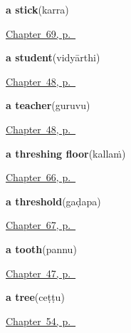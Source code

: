 \noindent\begin{minipage}[t]{\linewidth}
\raggedright
\textbf{a stick}\enspace\emph{}\enspace(karra)\par
\footnotesize \hyperref[ch:te-tools]{Chapter~69, p.~\pageref*{ch:te-tools}}
\end{minipage}\par\smallskip

\noindent\begin{minipage}[t]{\linewidth}
\raggedright
\textbf{a student}\enspace\emph{}\enspace(vidyārthi)\par
\footnotesize \hyperref[ch:te-roles]{Chapter~48, p.~\pageref*{ch:te-roles}}
\end{minipage}\par\smallskip

\noindent\begin{minipage}[t]{\linewidth}
\raggedright
\textbf{a teacher}\enspace\emph{}\enspace(guruvu)\par
\footnotesize \hyperref[ch:te-roles]{Chapter~48, p.~\pageref*{ch:te-roles}}
\end{minipage}\par\smallskip

\noindent\begin{minipage}[t]{\linewidth}
\raggedright
\textbf{a threshing floor}\enspace\emph{}\enspace(kallaṁ)\par
\footnotesize \hyperref[ch:te-the-field]{Chapter~66, p.~\pageref*{ch:te-the-field}}
\end{minipage}\par\smallskip

\noindent\begin{minipage}[t]{\linewidth}
\raggedright
\textbf{a threshold}\enspace\emph{}\enspace(gaḍapa)\par
\footnotesize \hyperref[ch:te-the-house-itself]{Chapter~67, p.~\pageref*{ch:te-the-house-itself}}
\end{minipage}\par\smallskip

\noindent\begin{minipage}[t]{\linewidth}
\raggedright
\textbf{a tooth}\enspace\emph{}\enspace(pannu)\par
\footnotesize \hyperref[ch:te-body-more]{Chapter~47, p.~\pageref*{ch:te-body-more}}
\end{minipage}\par\smallskip

\noindent\begin{minipage}[t]{\linewidth}
\raggedright
\textbf{a tree}\enspace\emph{}\enspace(ceṭṭu)\par
\footnotesize \hyperref[ch:te-tree]{Chapter~54, p.~\pageref*{ch:te-tree}}
\end{minipage}\par\smallskip

